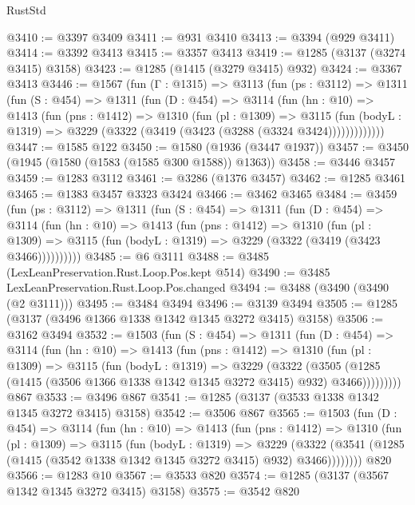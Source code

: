 \begin{lexlean}{RustStd}
\begin{coremodule}
@3410 := @3397 @3409
@3411 := @931 @3410
@3413 := @3394 (@929 @3411)
@3414 := @3392 @3413
@3415 := @3357 @3413
@3419 := @1285 (@3137 (@3274 @3415) @3158)
@3423 := @1285 (@1415 (@3279 @3415) @932)
@3424 := @3367 @3413
@3446 := @1567
    (fun (Γ : @1315) =>
    @3113
      (fun (ps : @3112) =>
      @1311
        (fun (S : @454) =>
        @1311
          (fun (D : @454) =>
          @3114
            (fun (hn : @10) =>
            @1413
              (fun (pns : @1412) =>
              @1310
                (fun (pl : @1309) =>
                @3115
                  (fun (bodyL : @1319) =>
                  @3229 (@3322 (@3419 (@3423 (@3288 (@3324 @3424)))))))))))))
@3447 := @1585 @122
@3450 := @1580 (@1936 (@3447 @1937))
@3457 := @3450 (@1945 (@1580 (@1583 (@1585 @300 @1588)) @1363))
@3458 := @3446 @3457
@3459 := @1283 @3112
@3461 := @3286 (@1376 @3457)
@3462 := @1285 @3461
@3465 := @1383 @3457 @3323 @3424
@3466 := @3462 @3465
@3484 := @3459
    (fun (ps : @3112) =>
    @1311
      (fun (S : @454) =>
      @1311
        (fun (D : @454) =>
        @3114
          (fun (hn : @10) =>
          @1413
            (fun (pns : @1412) =>
            @1310
              (fun (pl : @1309) =>
              @3115 (fun (bodyL : @1319) => @3229 (@3322 (@3419 (@3423 @3466))))))))))
@3485 := @6 @3111
@3488 := @3485 (LexLeanPreservation.Rust.Loop.Pos.kept @514)
@3490 := @3485 LexLeanPreservation.Rust.Loop.Pos.changed
@3494 := @3488 (@3490 (@3490 (@2 @3111)))
@3495 := @3484 @3494
@3496 := @3139 @3494
@3505 := @1285 (@3137 (@3496 @1366 @1338 @1342 @1345 @3272 @3415) @3158)
@3506 := @3162 @3494
@3532 := @1503
    (fun (S : @454) =>
    @1311
      (fun (D : @454) =>
      @3114
        (fun (hn : @10) =>
        @1413
          (fun (pns : @1412) =>
          @1310
            (fun (pl : @1309) =>
            @3115
              (fun (bodyL : @1319) =>
              @3229
                (@3322
                  (@3505
                    (@1285 (@1415 (@3506 @1366 @1338 @1342 @1345 @3272 @3415) @932) @3466)))))))))
    @867
@3533 := @3496 @867
@3541 := @1285 (@3137 (@3533 @1338 @1342 @1345 @3272 @3415) @3158)
@3542 := @3506 @867
@3565 := @1503
    (fun (D : @454) =>
    @3114
      (fun (hn : @10) =>
      @1413
        (fun (pns : @1412) =>
        @1310
          (fun (pl : @1309) =>
          @3115
            (fun (bodyL : @1319) =>
            @3229
              (@3322 (@3541 (@1285 (@1415 (@3542 @1338 @1342 @1345 @3272 @3415) @932) @3466))))))))
    @820
@3566 := @1283 @10
@3567 := @3533 @820
@3574 := @1285 (@3137 (@3567 @1342 @1345 @3272 @3415) @3158)
@3575 := @3542 @820

\end{coremodule}
\end{lexlean}

